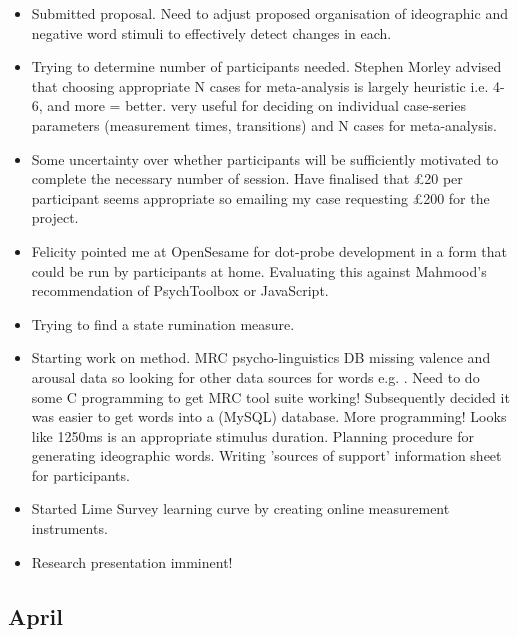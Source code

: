 \documentclass[british]{article}
\begin{document}
\begin{itemize}
  \item Submitted proposal. Need to adjust proposed organisation of
  ideographic and negative word stimuli to effectively detect changes
  in each.

  \item Trying to determine number of participants needed.
    Stephen Morley advised that choosing appropriate N cases for
    meta-analysis is largely heuristic i.e. 4-6, and more = better.
    \textcite{onghena_customization_2005} very useful for deciding on
    individual case-series parameters (measurement times, transitions)
    and N cases for meta-analysis.

  \item Some uncertainty over whether participants will be sufficiently
    motivated to complete the necessary number of session. Have finalised
    that \pounds20 per participant seems appropriate so emailing my case
    requesting \pounds200 for the project.

  \item Felicity pointed me at OpenSesame for dot-probe development in a form
    that could be run by participants at home. Evaluating this against Mahmood's
    recommendation of PsychToolbox or JavaScript.

  \item Trying to find a state rumination measure.
    
  \item Starting work on method. MRC psycho-linguistics DB missing
  valence and arousal data so looking for other data sources for words
  e.g. \textcite{citron_how_2014}. Need to do some C programming to
  get MRC tool suite working! Subsequently decided it was easier to get
  words into a (MySQL) database. More programming! Looks like 1250ms is
  an appropriate stimulus duration. Planning procedure for generating
  ideographic words.  Writing 'sources of support' information sheet
  for participants.

  \item Started Lime Survey learning curve by creating online measurement
    instruments.

  \item Research presentation imminent!
\end{itemize}

\subsection{April}
\end{document}
